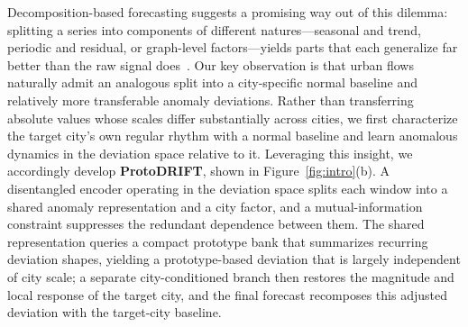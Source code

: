 
Decomposition-based forecasting suggests a promising way out of this dilemma: splitting a series into components of different natures—seasonal and trend, periodic and residual, or graph-level factors—yields parts that each generalize far better than the raw signal does~\cite{cost,hyperd,tgdl}. Our key observation is that urban flows naturally admit an analogous split into a city-specific normal baseline and relatively more transferable anomaly deviations. Rather than transferring absolute values whose scales differ substantially across cities, we first characterize the target city's own regular rhythm with a normal baseline and learn anomalous dynamics in the deviation space relative to it. Leveraging this insight, we accordingly develop \textbf{ProtoDRIFT}, shown in Figure~\ref{fig:intro}(b). A disentangled encoder operating in the deviation space splits each window into a shared anomaly representation and a city factor, and a mutual-information constraint suppresses the redundant dependence between them. The shared representation queries a compact prototype bank that summarizes recurring deviation shapes, yielding a prototype-based deviation that is largely independent of city scale; a separate city-conditioned branch then restores the magnitude and local response of the target city, and the final forecast recomposes this adjusted deviation with the target-city baseline.


